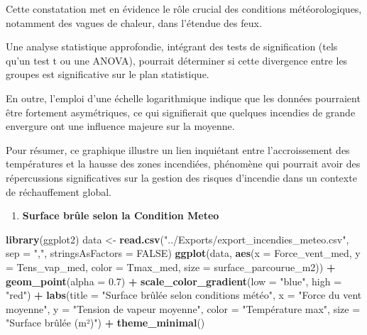 \documentclass[
]{article}
\newenvironment{Shaded}{\begin{snugshade}}{\end{snugshade}}
\newcommand{\AttributeTok}[1]{\textcolor[rgb]{0.13,0.29,0.53}{#1}}
\newcommand{\ConstantTok}[1]{\textcolor[rgb]{0.56,0.35,0.01}{#1}}
\newcommand{\FloatTok}[1]{\textcolor[rgb]{0.00,0.00,0.81}{#1}}
\newcommand{\FunctionTok}[1]{\textcolor[rgb]{0.13,0.29,0.53}{\textbf{#1}}}
\newcommand{\NormalTok}[1]{#1}
\newcommand{\OtherTok}[1]{\textcolor[rgb]{0.56,0.35,0.01}{#1}}
\newcommand{\SpecialCharTok}[1]{\textcolor[rgb]{0.81,0.36,0.00}{\textbf{#1}}}
\newcommand{\StringTok}[1]{\textcolor[rgb]{0.31,0.60,0.02}{#1}}
\providecommand{\tightlist}{%
  \setlength{\itemsep}{0pt}\setlength{\parskip}{0pt}}
\begin{document}
Cette constatation met en évidence le rôle crucial des conditions
météorologiques, notamment des vagues de chaleur, dans l'étendue des
feux.

Une analyse statistique approfondie, intégrant des tests de
signification (tels qu'un test t ou une ANOVA), pourrait déterminer si
cette divergence entre les groupes est significative sur le plan
statistique.

En outre, l'emploi d'une échelle logarithmique indique que les données
pourraient être fortement asymétriques, ce qui signifierait que quelques
incendies de grande envergure ont une influence majeure sur la moyenne.

Pour résumer, ce graphique illustre un lien inquiétant entre
l'accroissement des températures et la hausse des zones incendiées,
phénomène qui pourrait avoir des répercussions significatives sur la
gestion des risques d'incendie dans un contexte de réchauffement global.

\begin{enumerate}
\def\labelenumi{\arabic{enumi}.}
\setcounter{enumi}{4}
\tightlist
\item
  \textbf{Surface brûle selon la Condition Meteo}
\end{enumerate}

\begin{Shaded}
\begin{Highlighting}[]
\FunctionTok{library}\NormalTok{(ggplot2)}
\NormalTok{data }\OtherTok{\textless{}{-}} \FunctionTok{read.csv}\NormalTok{(}\StringTok{"../Exports/export\_incendies\_meteo.csv"}\NormalTok{, }\AttributeTok{sep =} \StringTok{","}\NormalTok{, }\AttributeTok{stringsAsFactors =} \ConstantTok{FALSE}\NormalTok{)}
\FunctionTok{ggplot}\NormalTok{(data, }\FunctionTok{aes}\NormalTok{(}\AttributeTok{x =}\NormalTok{ Force\_vent\_med, }\AttributeTok{y =}\NormalTok{ Tens\_vap\_med, }\AttributeTok{color =}\NormalTok{ Tmax\_med, }\AttributeTok{size =}\NormalTok{ surface\_parcourue\_m2)) }\SpecialCharTok{+}
  \FunctionTok{geom\_point}\NormalTok{(}\AttributeTok{alpha =} \FloatTok{0.7}\NormalTok{) }\SpecialCharTok{+}
  \FunctionTok{scale\_color\_gradient}\NormalTok{(}\AttributeTok{low =} \StringTok{"blue"}\NormalTok{, }\AttributeTok{high =} \StringTok{"red"}\NormalTok{) }\SpecialCharTok{+}
  \FunctionTok{labs}\NormalTok{(}\AttributeTok{title =} \StringTok{"Surface brûlée selon conditions météo"}\NormalTok{,}
       \AttributeTok{x =} \StringTok{"Force du vent moyenne"}\NormalTok{,}
       \AttributeTok{y =} \StringTok{"Tension de vapeur moyenne"}\NormalTok{,}
       \AttributeTok{color =} \StringTok{"Température max"}\NormalTok{,}
       \AttributeTok{size =} \StringTok{"Surface brûlée (m²)"}\NormalTok{) }\SpecialCharTok{+}
  \FunctionTok{theme\_minimal}\NormalTok{()}
\end{Highlighting}
\end{Shaded}
\end{document}
